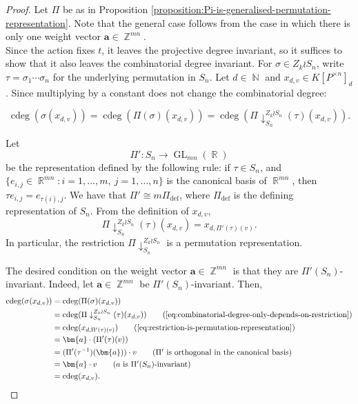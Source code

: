 \documentclass[a4paper,12pt]{amsart}
\theoremstyle{plain}
\theoremstyle{definition}
\theoremstyle{remark}
\DeclareMathOperator{\NN}{\mathbb{N}}
\DeclareMathOperator{\ZZ}{\mathbb{Z}}
\DeclareMathOperator{\RR}{\mathbb{R}}
\DeclareMathOperator{\cdeg}{cdeg}
\DeclareMathOperator{\defining}{def}
\DeclareMathOperator{\GL}{GL}
\begin{document}
\begin{proof}
Let $\Pi$ be as in Proposition \ref{proposition:Pi-is-generalised-permutation-representation}. Note that the general case follows from the case in which there is only one weight vector $\bm{a} \in \ZZ^{mn}$. \\

Since the action fixes $t$, it leaves the projective degree invariant, so it suffices to show that it also leaves the combinatorial degree invariant. For $\sigma \in Z_k \wr S_n$, write $\tau = \sigma_1 \cdots \sigma_n$ for the underlying permutation in $S_n$. Let $d \in \NN$ and $x_{d, v} \in K[P^{\times n}]_d$. Since multiplying by a constant does not change the combinatorial degree:

\begin{equation}\label{eq:combinatorial-degree-only-depends-on-restriction}
    \cdeg(\sigma(x_{d, v})) = \cdeg(\Pi(\sigma)(x_{d, v})) = \cdeg(\Pi\downarrow^{Z_k \wr S_n}_{S_n}(\tau)(x_{d, v})).
\end{equation}

Let
\[
\Pi': S_n \to \GL_{mn}(\RR)
\]
be the representation defined by the following rule: if $\tau \in S_n$, and $\{e_{i, j} \in \RR^{mn}: i = 1, \ldots, m, ~j = 1, \ldots, n\}$ is the canonical basis of $\RR^{mn}$, then $\tau e_{i, j} = e_{\tau(i), j}$. We have that $\Pi' \cong m\Pi_{\defining}$, where $\Pi_{\defining}$ is the defining representation of $S_n$. From the definition of $x_{d, v}$, 
\begin{equation}\label{eq:restriction-is-permutation-representation}
    \Pi\downarrow^{Z_k \wr S_n}_{S_n}(\tau)(x_{d, v}) = x_{d, \Pi'(\tau)(v)}.
\end{equation}
In particular, the restriction $\Pi\downarrow^{Z_k \wr S_n}_{S_n}$ is a permutation representation.

The desired condition on the weight vector $\bm{a} \in \ZZ^{mn}$ is that they are $\Pi'(S_n)$-invariant. Indeed, let $\bm{a} \in \ZZ^{mn}$ be $\Pi'(S_n)$-invariant. Then,
\begin{align*}
    \cdeg(\sigma(x_{d, v})) 
    &= \cdeg(\Pi(\sigma)(x_{d, v})) \\
    &= \cdeg(\Pi\downarrow^{Z_k \wr S_n}_{S_n}(\tau)(x_{d, v})) \tag{\ref{eq:combinatorial-degree-only-depends-on-restriction}} \\
    &= \cdeg(x_{d, \Pi'(\tau)(v)}) \tag{\ref{eq:restriction-is-permutation-representation}} \\
    &= \bm{a} \cdot (\Pi'(\tau)(v)) \\
    &= (\Pi'(\tau^{-1})(\bm{a})) \cdot v \tag{$\Pi'$ is orthogonal in the canonical basis} \\
    &= \bm{a} \cdot v \tag{$a$ is $\Pi'(S_n)$-invariant} \\
    &= \cdeg(x_{d,v}).
\end{align*}


\end{proof}
\end{document}
